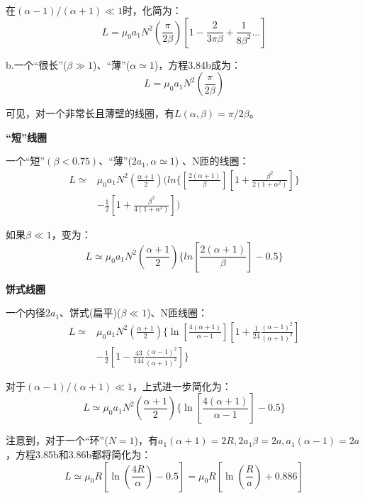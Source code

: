 在$(\alpha−1)/(\alpha+1)\ll 1$时，化简为：
\begin{equation*}
  L=\mu_0a_1N^2\left(\frac{\pi}{2\beta}\right)\left[1-\frac{2}{3\pi\beta}+\frac{1}{8\beta^2}...\right] \tag{3.84b}%
\end{equation*}

b.一个“很长”($\beta\gg 1$)、“薄”($\alpha \simeq 1$)，方程3.84b成为：
\begin{equation*}
  L=\mu_0a_1N^2(\frac{\pi}{2\beta}) \tag{3.84c}%
\end{equation*}

可见，对一个非常长且薄壁的线圈，有$L(\alpha,\beta)=\pi/2\beta$。

\textbf{“短”线圈}

 一个“短”$(\beta<0.75)$、“薄”($2a_1,\alpha\simeq 1$) 、N匝的线圈：
  \begin{equation}
  \begin{split}
L\simeq&\mu_0a_1N^2(\frac{\alpha+1}{2})(ln\{[\frac{2(\alpha+1)}{\beta}][1+\frac{\beta^2}{2(1+\alpha^2)}]\}\\
&-\frac{1}{2}[1+\frac{\beta^2}{4(1+\alpha^2)}])%
  \end{split}
  \end{equation}
  
  如果$\beta \ll 1$，变为：
  \begin{equation*}
L\simeq\mu_0a_1N^2(\frac{\alpha+1}{2})\{ln[\frac{2(\alpha+1)}{\beta}]-0.5\} \tag{3.85'}%
\end{equation*}

\textbf{饼式线圈}

  一个内径$2a_1$、饼式(扁平)($\beta\ll 1$)、N匝线圈：
  \begin{equation}
  \begin{split}
L\simeq & \mu_0a_1N^2(\frac{\alpha+1}{2})\{\ln[\frac{4(\alpha+1)}{\alpha-1}][1+\frac{1}{24}\frac{(\alpha-1)^2}{(\alpha+1)^2}]\\
&-\frac{1}{2}[1-\frac{43}{144}\frac{(\alpha-1)^2}{(\alpha+1)^2}]\}%
  \end{split}
\end{equation}

对于$(\alpha-1)/(\alpha+1)\ll 1$，上式进一步简化为：
\begin{equation*}
L\simeq\mu_0a_1N^2(\frac{\alpha+1}{2})\{\ln[\frac{4(\alpha+1)}{\alpha-1}]-0.5\} \tag{3.86'}%
\end{equation*}

注意到，对于一个“环”($N=1$)，有$a_1(\alpha+1)=2R,2a_1\beta=2a,a_1(\alpha-1)=2a$，方程3.85b和3.86b都将简化为：
\begin{equation*}
L\simeq\mu_0R[\ln(\frac{4R}{\alpha})-0.5]=\mu_0R[\ln(\frac{R}{a})+0.886] \tag{3.86''}%
\end{equation*}

